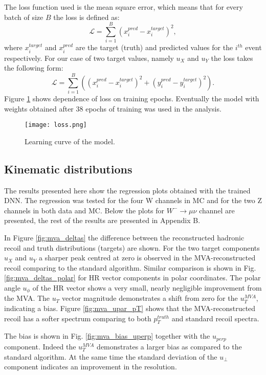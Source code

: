 The loss function used is the mean square error, which means that for every batch of size $B$ the loss is defined as:
\begin{equation}
 \mathcal{L}=\sum_{i=1}^B(x_i^{pred}-x_i^{target})^2,
\end{equation}
where $x_i^{target}$ and $x_i^{pred}$ are the target (truth) and predicted values for the $i^{th}$ event respectively. For our case of two target values, namely $u_X$ and $u_Y$ the loss takes the following form:
\begin{equation}
\mathcal{L}=\sum_{i=1}^B\left((x_i^{pred}-x_i^{target})^2+(y_i^{pred}-y_i^{target})^2\right).
\end{equation}
Figure \ref{fig::nntraining} shows dependence of loss on training epochs. Eventually the model with weights obtained after 38 epochs of training was used in the analysis. 
\begin{figure}[htpb]
	\centering
	\texttt{[image: loss.png]}
	\caption{Learning curve of the model.}
	\label{fig::nntraining}
\end{figure}
\subsection{Kinematic distributions} 
The results presented here show the regression plots obtained with the trained DNN. The regression was tested for the four W channels in MC and for the two Z channels in both data and MC. Below the plots for $W^-\rightarrow \mu \nu$ channel are presented, the rest of the results are presented in Appendix B.

In Figure \ref{fig:mva_deltas} the difference between the reconstructed hadronic recoil and truth distributions (targets) are shown. For the two target components $u_X$ and $u_Y$ a sharper peak centred at zero is observed in the MVA-reconstructed recoil comparing to the standard algorithm. Similar comparison is shown in Fig. \ref{fig:mva_deltas_polar} for HR vector components in polar coordinates. The polar angle $u_{\phi}$ of the HR vector shows a very small, nearly negligible improvement from the MVA. The $u_T$ vector magnitude demonstrates a shift from zero for the $u_T^{MVA}$, indicating a bias. Figure \ref{fig:mva_upar_pT} shows that the MVA-reconstructed recoil has a softer spectrum comparing to both $p_T^{truth}$ and standard recoil spectra.

The bias is shown in Fig. \ref{fig:mva_bias_uperp} together with the $u_{perp}$ component. Indeed the $u_T^{MVA}$ demonstrates a larger bias as compared to the standard algorithm. At the same time the standard deviation of the $u_{\perp}$ component indicates an improvement in the resolution.

